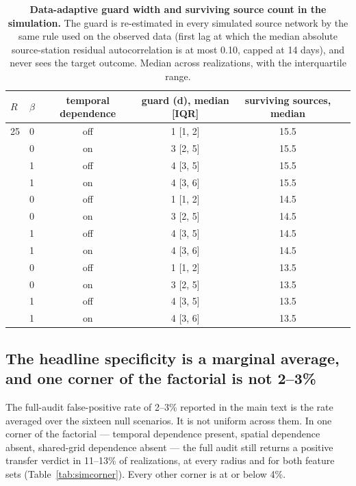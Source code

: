 \documentclass[11pt]{article}
\begin{document}
\begin{table}[htbp]\centering\footnotesize
\caption{\textbf{Data-adaptive guard width and surviving source count in the simulation.} The guard is re-estimated in every simulated source network by the same rule used on the observed data (first lag at which the median absolute source-station residual autocorrelation is at most 0.10, capped at 14 days), and never sees the target outcome. Median across realizations, with the interquartile range.}
\label{si:t39}
\begin{tabular}{llcccc}\toprule
$R$ & $\beta$ & temporal dependence & guard (d), median [IQR] & surviving sources, median \\ \midrule
25 & 0 & off & 1 [1, 2] & 15.5 \\
 & 0 & on & 3 [2, 5] & 15.5 \\
 & 1 & off & 4 [3, 5] & 15.5 \\
 & 1 & on & 4 [3, 6] & 15.5 \\
\addlinespace
50 & 0 & off & 1 [1, 2] & 14.5 \\
 & 0 & on & 3 [2, 5] & 14.5 \\
 & 1 & off & 4 [3, 5] & 14.5 \\
 & 1 & on & 4 [3, 6] & 14.5 \\
\addlinespace
100 & 0 & off & 1 [1, 2] & 13.5 \\
 & 0 & on & 3 [2, 5] & 13.5 \\
 & 1 & off & 4 [3, 5] & 13.5 \\
 & 1 & on & 4 [3, 6] & 13.5 \\
\bottomrule\end{tabular}\end{table}

\subsection*{The headline specificity is a marginal average, and one corner of the factorial is not 2--3\%}
The full-audit false-positive rate of 2--3\% reported in the main text is the rate averaged over
the sixteen null scenarios. It is not uniform across them. In one corner of the factorial ---
temporal dependence present, spatial dependence absent, shared-grid dependence absent --- the full
audit still returns a positive transfer verdict in 11--13\% of realizations, at every radius and for
both feature sets (Table~\ref{tab:simcorner}). Every other corner is at or below 4\%.
\end{document}
